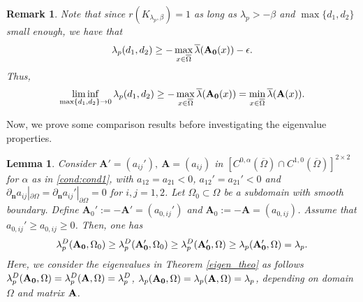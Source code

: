 \documentclass[a4paper,11pt]{amsart}
\newtheorem{lemma}[theorem]{Lemma}
\newtheorem{remark}{Remark}
\theoremstyle{definition}
\def\O{\Omega}
\numberwithin{equation}{section}
\theoremstyle{definition}
\def\O{\Omega}
\begin{document}
\begin{remark}\label{remark2}
Note that since $r(K_{\lambda_p,\beta})=1$ as long as $\lambda_p>-\beta$ and $\max\{d_1,d_2\}$ small enough, we have that
\begin{align*}
\lambda_p(d_1,d_2)\geq -\max\limits_{x\in\overline{\O}}\overline{\lambda}({\bf A_{\bf 0}}(x))-\epsilon.
\end{align*}
Thus,
\begin{align*}
\liminf_{\max\{d_1,d_2\}\rightarrow 0}\lambda_p(d_1,d_2)\geq -\max\limits_{x\in\overline{\O}}\overline{\lambda}({{\bf A}_{\bf 0}}(x))=\min\limits_{x\in\overline{\O}}\overline{\lambda}({{\bf A}}(x)).
\end{align*}
\end{remark}

Now, we prove some comparison results before investigating the eigenvalue properties.

\begin{lemma}\label{lemma:com}
Consider $\mathbf{A}'=(a_{ij}'),~\mathbf{A}=(a_{ij})$ in $[C^{0,\alpha}(\overline{\O}) \cap C^{1,0}(\overline{\O})]^{2\times 2}$ for $\alpha$ as in \ref{cond:cond1}, with $a_{12}=a_{21}<0$, $a_{12}'=a_{21}'<0$ and $\partial_{\mathbf{n}} a_{ij}|_{\partial \O} = \partial_{\mathbf{n}} a_{ij}'|_{\partial \O} = 0$ for $i,j=1,2$. Let $\O_0\subset \O$ be a subdomain with smooth boundary. Define $\mathbf{A}_0':=-\mathbf{A}'=(a_{0,ij}')$ and $\mathbf{A}_0:=-\mathbf{A}=(a_{0,ij})$. Assume that $a_{0,ij}' \geq a_{0,ij} \geq 0$. Then, one has
\begin{align*}
\lambda^D_p({\bf A_0},\O_0)\geq \lambda^D_p({\bf A_0'},\O_0)\geq \lambda_p^D({\bf A_0'},\O)\geq \lambda_p({\bf A_0'},\O)=\lambda_p.
\end{align*}
Here, we consider the eigenvalues in Theorem \ref{eigen_theo} as follows $\lambda^D_p({\bf A_0},\O)=\lambda^D_p({\bf A},\O)=\lambda^D_p$, $\lambda_p({\bf A_0},\O)=\lambda_p({\bf A},\O)=\lambda_p$, depending on domain $\O$ and matrix ${\bf A}$.

\end{lemma}
\end{document}
